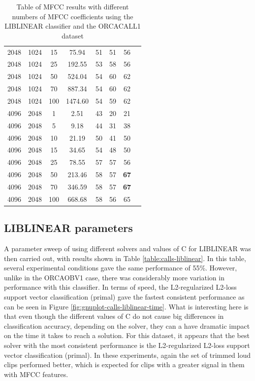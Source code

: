 \documentclass[12pt,oneside]{book}
\begin{document}
\begin{table}
\begin{tabular}{|c|c|c|c|c|c|c|c}
2048 & 1024 & 15   &        75.94  &    51 &  51  &  56 \\
2048 & 1024 & 25   &       192.55  &    53 &  58  &  56 \\
2048 & 1024 & 50   &       524.04  &    54 &  60  &  62 \\
2048 & 1024 & 70   &       887.34  &    54 &  60  &  62 \\
2048 & 1024 & 100  &      1474.60  &    54 &  59  &  62 \\
\hline
4096 & 2048 & 1    &         2.51  &    43 &  20  &  21 \\
4096 & 2048 & 5    &         9.18  &    44 &  31  &  38 \\
4096 & 2048 & 10   &        21.19  &    50 &  41  &  50 \\
4096 & 2048 & 15   &        34.65  &    54 &  48  &  50 \\
4096 & 2048 & 25   &        78.55  &    57 &  57  &  56 \\
4096 & 2048 & 50   &       213.46  &    58 &  57  &  \textbf{67} \\
4096 & 2048 & 70   &       346.59  &    58 &  57  &  \textbf{67} \\
4096 & 2048 & 100  &       668.68  &    58 &  56  &  65 \\
\hline
\end{tabular}
\caption{Table of MFCC results with different numbers of MFCC
  coefficients using the LIBLINEAR classifier and the ORCACALL1 dataset}
\label{table:calls-numMfccs}
\end{table}

%
%
\subsection{LIBLINEAR parameters}

A parameter sweep of using different solvers and values of C for
LIBLINEAR was then carried out, with results shown in Table
\ref{table:calls-liblinear}.  In this table, several experimental
conditions gave the same performance of 55\%.  However, unlike in the
ORCAOBV1 case, there was considerably more variation in performance
with this classifier.  In terms of speed, the L2-regularized L2-loss
support vector classification (primal) gave the fastest consistent
performance as can be seen in Figure
\ref{fig:gnuplot-calls-liblinear-time}.  What is interesting here is
that even though the different values of C do not cause big
differences in classification accuracy, depending on the solver, they
can a have dramatic impact on the time it takes to reach a solution.
For this dataset, it appears that the best solver with the most
consistent performance is the L2-regularized L2-loss support vector
classification (primal).  In these experiments, again the set of
trimmed loud clips performed better, which is expected for clips with
a greater signal in them with MFCC features.
\end{document}
